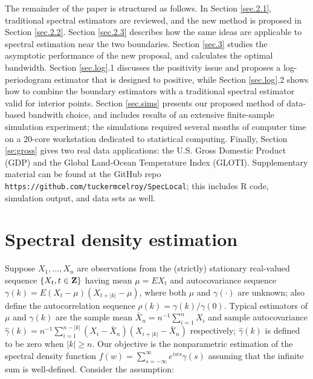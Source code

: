 \documentclass[12p E.Lt,psfig]{article} %
\begin{document}
The remainder of the paper is structured as follows.
In Section \ref{sec.2.1},   traditional  spectral estimators are reviewed,
and the new method is proposed in  Section \ref{sec.2.2}.
Section \ref{sec.2.3} describes how the same ideas are applicable to
spectral   estimation near the two boundaries.
Section   \ref{sec.3} studies the asymptotic performance of the new proposal,
and calculates the optimal bandwidth.
  Section   \ref{sec.log}.1 discusses the positivity issue and proposes a
log-periodogram estimator that is designed to positive, while
 Section   \ref{sec.log}.2 shows how to combine the boundary estimators
with a traditional spectral estimator valid for interior points.
 Section   \ref{sec.sims} presents our proposed method of 
data-based bandwith choice, and includes results of an extensive
  finite-sample simulation experiment; the simulations required   
several months
of computer time  on a 20-core  workstation dedicated to statistical computing.
Finally,  Section   \ref{se:gross} gives two  real data applications: 
the U.S. Gross Domestic Product (GDP) and the Global Land-Ocean Temperature
Index (GLOTI).
Supplementary material can be found at the GitHub repo {\tt 
https://github.com/tuckermcelroy/SpecLocal};
this includes R code, simulation output, and data sets as well.



\section{Spectral density estimation}
\label{sec.2}

Suppose $X_1,\ldots,X_n$ are observations from
the  (strictly)  stationary real-valued
sequence $\{X_t, t\in {\bf Z} \}$ having   mean $\mu = EX_t$ and autocovariance
sequence $\gamma (k) =E(X_t -\mu )(X_{t+|k|} -\mu )$,
   where both $\mu$ and $\gamma (\cdot )$ are unknown;
also define the autocorrelation sequence $  \rho (k)=   \gamma (k)/  \gamma (0)$.
Typical estimators of $\mu$ and $\gamma (k)$ are the sample mean
$\bar X_n=n^{-1}\sum_{i=1}^{n} X_i$ and sample autocovariance
$\hat \gamma (k)=n^{-1}\sum_{i=1}^{n-|k|} (X_i- \bar X_n)(X_{i+|k|}- \bar X_n)  $ respectively;
 $\hat \gamma (k)  $ is defined to be
zero when  $|k|\geq n$.
Our objective is the nonparametric estimation of
 the spectral density function
 $f(w)=   \sum_{s=-\infty}^\infty e^{iws}\gamma (s) $ %
assuming that the infinite sum is well-defined.
Consider the assumption:
\end{document}
